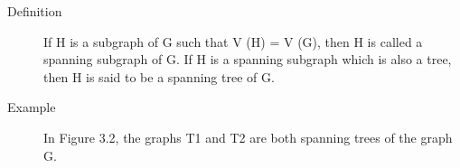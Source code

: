 \documentclass[12pt]{article}
\begin{document}

\begin{description}
\item[Definition]  If H is a subgraph of G such that V (H) = V (G), then H
is called a spanning subgraph of G. If H is a spanning subgraph
which is also a tree, then H is said to be a spanning tree of G.

\item[Example] In Figure 3.2, the graphs T1 and T2 are both spanning
trees of the graph G.
\end{description}


\end{document}
